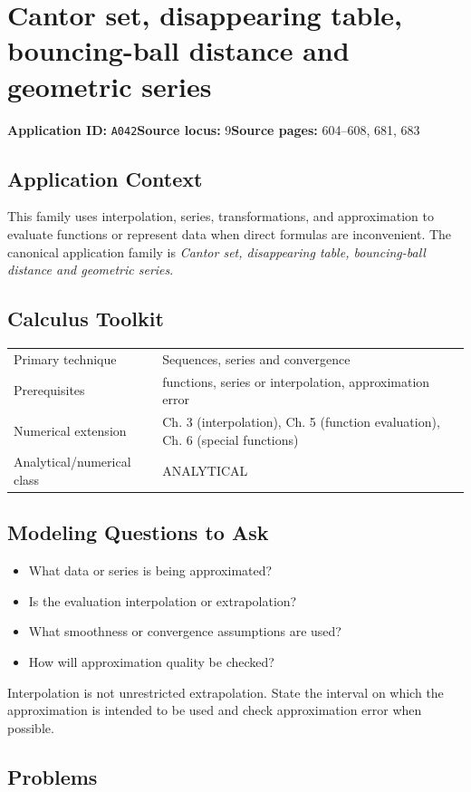\documentclass[11pt]{book}
\newcommand{\pid}[1]{\texttt{#1}}
\begin{document}
\chapter{Cantor set, disappearing table, bouncing-ball distance and geometric series}\label{app:A042}
\textbf{Application ID:} \pid{A042}\quad \textbf{Source locus:} 9\quad \textbf{Source pages:} 604–608, 681, 683
\section*{Application Context}
This family uses interpolation, series, transformations, and approximation to evaluate functions or represent data when direct formulas are inconvenient. The canonical application family is \emph{Cantor set, disappearing table, bouncing-ball distance and geometric series}.
\section*{Calculus Toolkit}
\begin{tabularx}{\textwidth}{@{}lX@{}}\toprule
Primary technique & Sequences, series and convergence \\
Prerequisites & functions, series or interpolation, approximation error \\
Numerical extension & Ch. 3 (interpolation), Ch. 5 (function evaluation), Ch. 6 (special functions) \\
Analytical/numerical class & ANALYTICAL \\
\bottomrule\end{tabularx}
\section*{Modeling Questions to Ask}\begin{itemize}
\item What data or series is being approximated?
\item Is the evaluation interpolation or extrapolation?
\item What smoothness or convergence assumptions are used?
\item How will approximation quality be checked?
\end{itemize}
\begin{errorbox}Interpolation is not unrestricted extrapolation. State the interval on which the approximation is intended to be used and check approximation error when possible.\end{errorbox}
\section*{Problems}
\end{document}
